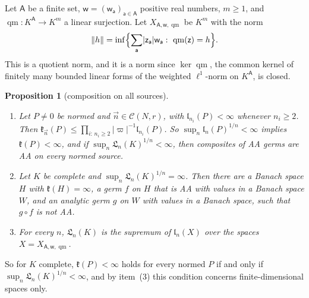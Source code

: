 \documentclass[11pt]{amsart}
\newtheorem{proposition}[theorem]{Proposition}
\theoremstyle{definition}
\theoremstyle{remark}
\numberwithin{equation}{section}
\newcommand{\abs}[1]{\lvert #1\rvert}
\newcommand{\norm}[1]{\lVert #1\rVert}
\theoremstyle{plain}
\theoremstyle{definition}
\theoremstyle{plain}
\begin{document}
Let $\mathsf A$ be a finite set, $\mathsf w=(\mathsf w_{\mathsf a})_{\mathsf a\in\mathsf A}$ positive real numbers, $m\ge1$, and $\operatorname{qm}\colon K^{\mathsf A}\to K^m$ a linear surjection. Let $X_{\mathsf A,\mathsf w,\operatorname{qm}}$ be $K^m$ with the norm
\[
 \norm h=\inf\Bigl\{\sum_{\mathsf a}\abs{\mathsf z_{\mathsf a}}\mathsf w_{\mathsf a}:\ \operatorname{qm}(\mathsf z)=h\Bigr\}.
\]
This is a quotient norm, and it is a norm since $\ker\operatorname{qm}$, the common kernel of finitely many bounded linear forms of the weighted $\ell^1$-norm on $K^{\mathsf A}$, is closed.

\begin{proposition}[composition on all sources]\label{dp:prop:all-sources}
\leavevmode
\begin{enumerate}
\item Let $P\ne0$ be normed and $\vec n\in\mathcal C(N,r)$, with $\mathfrak l_{n_i}(P)<\infty$ whenever $n_i\ge2$. Then $\mathfrak k_{\vec n}(P)\le\prod_{i:\,n_i\ge2}\abs\varpi^{-1}\mathfrak l_{n_i}(P)$. So $\sup_n\mathfrak l_n(P)^{1/n}<\infty$ implies $\mathfrak k(P)<\infty$, and if $\sup_n\mathfrak L_n(K)^{1/n}<\infty$, then composites of AA germs are AA on every normed source.
\item Let $K$ be complete and $\sup_n\mathfrak L_n(K)^{1/n}=\infty$. Then there are a Banach space $H$ with $\mathfrak k(H)=\infty$, a germ $f$ on $H$ that is AA with values in a Banach space $W$, and an analytic germ $g$ on $W$ with values in a Banach space, such that $g\circ f$ is not AA.
\item For every $n$, $\mathfrak L_n(K)$ is the supremum of $\mathfrak l_n(X)$ over the spaces $X=X_{\mathsf A,\mathsf w,\operatorname{qm}}$.
\end{enumerate}
\end{proposition}

So for $K$ complete, $\mathfrak k(P)<\infty$ holds for every normed $P$ if and only if $\sup_n\mathfrak L_n(K)^{1/n}<\infty$, and by item~(3) this condition concerns finite-dimensional spaces only.
\end{document}
